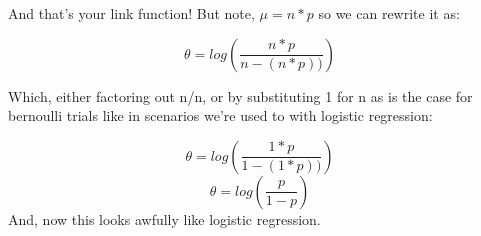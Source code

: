 \documentclass[
]{article}
\begin{document}
And that's your link function! But note, \(\mu = n*p\) so we can rewrite
it as:

\[\theta = log(\frac{n*p}{n-(n*p))})\]

Which, either factoring out n/n, or by substituting 1 for n as is the
case for bernoulli trials like in scenarios we're used to with logistic
regression:

\[\theta = log(\frac{1*p}{1-(1*p))})\] \[\theta = log(\frac{p}{1-p})\]
And, now this looks awfully like logistic regression.
\end{document}
